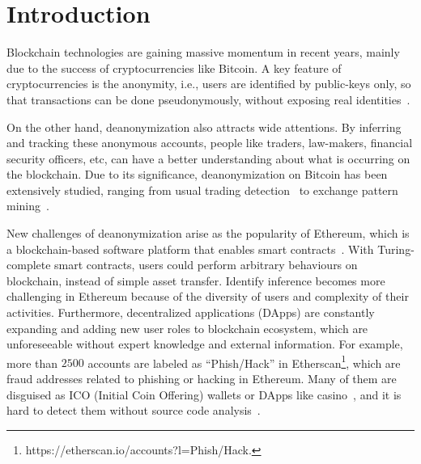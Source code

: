 \section{Introduction}
Blockchain technologies are gaining massive momentum in recent years, mainly due to the success of cryptocurrencies like Bitcoin. A key feature of cryptocurrencies is the anonymity, i.e., users are identified by public-keys only, so that transactions can be done pseudonymously, without exposing real identities~\cite{reid2013analysis}.

On the other hand, deanonymization also attracts wide attentions. By inferring and tracking these anonymous accounts, people like traders, law-makers, financial security officers, etc, can have a better understanding about what is occurring on the blockchain. Due to its significance, deanonymization on Bitcoin has been extensively studied, ranging from usual trading detection~\cite{maesa2016analysis} to exchange pattern mining~\cite{ranshous2017exchange}.
 

New challenges of deanonymization arise as the popularity of Ethereum, which is a blockchain-based software platform that enables smart contracts~\cite{buterin2013ethereum}.
With Turing-complete smart contracts, users could perform arbitrary behaviours on blockchain, instead of simple asset transfer. 
Identify inference becomes more challenging in Ethereum because of the diversity of users and complexity of their activities. Furthermore, decentralized applications (DApps) are constantly expanding and adding new user roles to blockchain ecosystem, which are unforeseeable without expert knowledge and external information.
For example, more than $2500$ accounts are labeled as ``Phish/Hack'' in Etherscan\footnote{https://etherscan.io/accounts?l=Phish/Hack.}, which are fraud addresses related to phishing or hacking in Ethereum. Many of them are disguised as ICO (Initial Coin Offering) wallets or DApps like casino~\cite{cerchiello2018icos}, and it is hard to detect them without source code analysis~\cite{jiang2018contractfuzzer}. 

